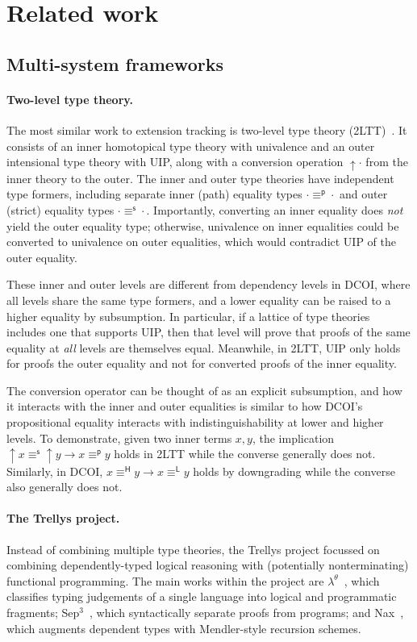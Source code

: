 \documentclass{article}
\newcommand{\HH}{\mathsf{H}}
\newcommand{\LL}{\mathsf{L}}
\newcommand{\oo}{\mathsf{s}}
\newcommand{\ii}{\mathsf{p}}
\begin{document}
\section{Related work} \label{sec:related}

\subsection{Multi-system frameworks}

\paragraph{Two-level type theory.}
The most similar work to extension tracking is two-level type theory (2LTT)~\citep{2ls,2ltt}.
It consists of an inner homotopical type theory with univalence
and an outer intensional type theory with UIP,
along with a conversion operation $\mathop{\uparrow} \cdot$ from the inner theory to the outer.
The inner and outer type theories have independent type formers,
including separate inner (path) equality types $\cdot \equiv^\ii \cdot$
and outer (strict) equality types $\cdot \equiv^\oo \cdot$.
Importantly, converting an inner equality does \emph{not} yield the outer equality type;
otherwise, univalence on inner equalities could be converted to univalence on outer equalities,
which would contradict UIP of the outer equality.

These inner and outer levels are different from dependency levels in DCOI,
where all levels share the same type formers,
and a lower equality can be raised to a higher equality by subsumption.
In particular, if a lattice of type theories includes one that supports UIP,
then that level will prove that proofs of the same equality at \emph{all} levels are themselves equal.
Meanwhile, in 2LTT, UIP only holds for proofs the outer equality
and not for converted proofs of the inner equality.

The conversion operator can be thought of as an explicit subsumption,
and how it interacts with the inner and outer equalities
is similar to how DCOI's propositional equality interacts with indistinguishability
at lower and higher levels.
To demonstrate, given two inner terms $x, y$,
the implication $\mathop{\uparrow} x \equiv^\oo \mathop{\uparrow} y \to x \equiv^\ii y$
holds in 2LTT while the converse generally does not.
Similarly, in DCOI, $x \equiv^\HH y \to x \equiv^\LL y$ holds by downgrading
while the converse also generally does not.

\paragraph{The Trellys project.}
Instead of combining multiple type theories,
the Trellys project focussed on combining dependently-typed logical reasoning
with (potentially nonterminating) functional programming.
The main works within the project are $\lambda^\theta$~\citep{lambda-theta},
which classifies typing judgements of a single language into logical and programmatic fragments;
Sep$^3$~\citep{sep3}, which syntactically separate proofs from programs;
and Nax~\citep{nax}, which augments dependent types with Mendler-style recursion schemes.
\end{document}
